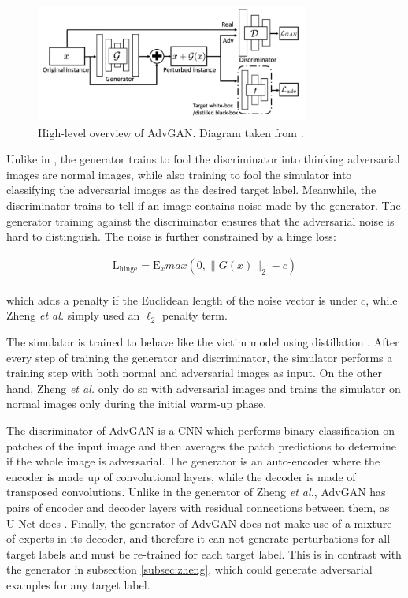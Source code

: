 \begin{figure}[h]
    \centering
    \includegraphics[width=0.8\textwidth]{graphics/advgan.PNG}
    \caption{High-level overview of AdvGAN. Diagram taken from \cite{advGAN}.}
    \label{fig:advgan}
\end{figure}

Unlike in \cite{zheng_black_box_GAN}, the generator trains to fool the discriminator into thinking adversarial images are normal images, while also training to fool the simulator into classifying the adversarial images as the desired target label. Meanwhile, the discriminator trains to tell if an image contains noise made by the generator. The generator training against the discriminator ensures that the adversarial noise is hard to distinguish. The noise is further constrained by a hinge loss:

\begin{equation}
\begin{aligned}
\mathrm{L}_\textrm{hinge} = \mathrm{E}_x max(0, \|G(x)\|_2 - c)\\
\label{eq:advgan_hing_loss}
\end{aligned}
\end{equation}

which adds a penalty if the Euclidean length of the noise vector is under $c$, while Zheng \textit{et al.} simply used an $\ell_2$ penalty term.

The simulator is trained to behave like the victim model using distillation \cite{distillation}. After every step of training the generator and discriminator, the simulator performs a training step with both normal and adversarial images as input. On the other hand, Zheng \textit{et al.} \cite{zheng_black_box_GAN} only do so with adversarial images and trains the simulator on normal images only during the initial warm-up phase.

The discriminator of AdvGAN is a CNN which performs binary classification on patches of the input image and then averages the patch predictions to determine if the whole image is adversarial. The generator is an auto-encoder where the encoder is made up of convolutional layers, while the decoder is made of transposed convolutions. Unlike in the generator of Zheng \textit{et al.}, AdvGAN has pairs of encoder and decoder layers with residual connections between them, as U-Net does \cite{unet}. Finally, the generator of AdvGAN does not make use of a mixture-of-experts in its decoder, and therefore it can not generate perturbations for all target labels and must be re-trained for each target label. This is in contrast with the generator in subsection \ref{subsec:zheng}, which could generate adversarial examples for any target label.


